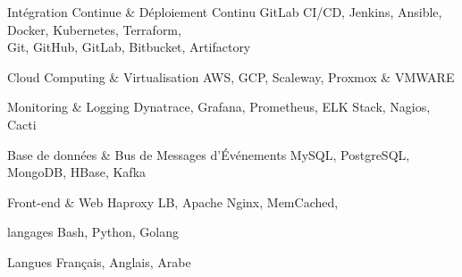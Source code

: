 

\begin{cvskills}

\cvskill
    {Intégration Continue \& Déploiement Continu} %
    {GitLab CI/CD, Jenkins, Ansible, Docker, Kubernetes, Terraform, \\
    Git, GitHub, GitLab, Bitbucket, Artifactory} %

  \cvskill
    {Cloud Computing \& Virtualisation} %
    {AWS, GCP, Scaleway, Proxmox \& VMWARE} %


  \cvskill
    {Monitoring \& Logging} %
    {Dynatrace, Grafana, Prometheus, ELK Stack, Nagios, Cacti} %

  \cvskill
    {Base de données \& Bus de Messages d'Événements} %
    {MySQL, PostgreSQL, MongoDB, HBase, Kafka} %

  \cvskill
    {Front-end \& Web} %
    {Haproxy LB, Apache Nginx, MemCached,} %

  \cvskill
    {langages} %
    {Bash, Python, Golang} %

  \cvskill
    {Langues} %
    {Français, Anglais, Arabe} %

\end{cvskills}
